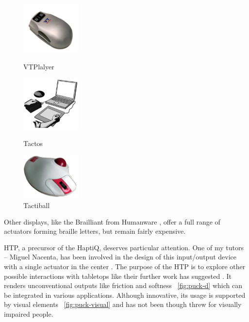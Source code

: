 \begin{figure}[!ht]
	\begin{minipage}[c]{.32\linewidth}
		\centering
		\includegraphics[width=3cm]{figures/vtplayer.png}
		\caption{VTPlalyer}
		\end{minipage} \hfill
	\begin{minipage}[c]{.32\linewidth}
			\centering
		\includegraphics[width=3cm]{figures/tactos.png}
		\caption{Tactos}
	\end{minipage}
	\begin{minipage}[c]{.32\linewidth}
		\centering
		\includegraphics[width=3cm]{figures/tactiball.png}
		\caption{Tactiball}
	\end{minipage}
\end{figure}

Other displays, like the Brailliant from Humanware \cite{HumanWare},
offer a full range of actuators forming braille letters, but remain
fairly expensive.

HTP, a precursor of the HaptiQ, deserves particular attention. One of my
tutors -- Miguel Nacenta, has been involved in the design of this
input/output device with a single actuator in the center \cite{marquardt2009haptic}. The purpose of the HTP is to explore other possible
interactions with tabletops like their further work has suggested \cite{ledo2012haptictouch}. It renders unconventional outputs like friction and softness ~\ref{fig:puck-d}
which can be integrated in various applications. Although innovative,
its usage is supported by visual elements ~\ref{fig:puck-visual} and has not been though threw
for visually impaired people.

